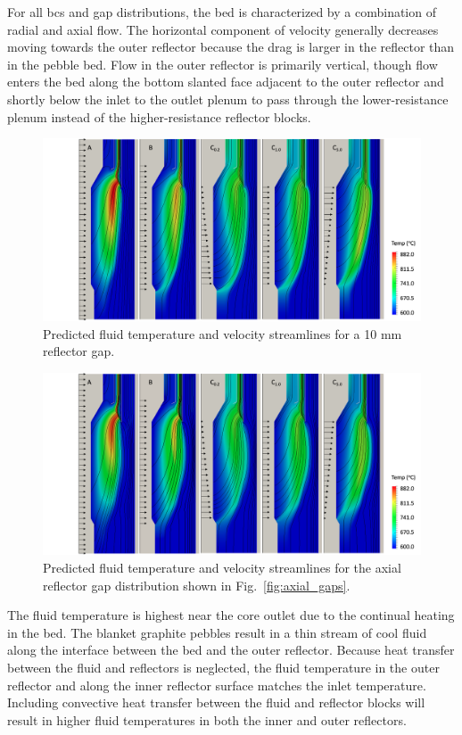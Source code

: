 For all \glspl{bc} and gap distributions, the bed is characterized by a combination of radial and axial flow. The horizontal component of velocity generally decreases moving towards the outer reflector because the drag is larger in the reflector than in the pebble bed. Flow in the outer reflector is primarily vertical, though flow enters the bed along the bottom slanted face adjacent to the outer reflector and shortly below the inlet to the outlet plenum to pass through the lower-resistance plenum instead of the higher-resistance reflector blocks.

\begin{figure}[!htb]
\centering
\includegraphics[width=0.85\linewidth]{figs/fluid_temp_1.png}
\caption{Predicted fluid temperature and velocity streamlines for a 10 \si{\milli\meter} reflector gap.}
\label{fig:bcs_temp2}
\end{figure}

\begin{figure}[!htb]
\centering
\includegraphics[width=0.85\linewidth]{figs/fluid_temp_axial.png}
\caption{Predicted fluid temperature and velocity streamlines for the axial reflector gap distribution shown in Fig.\ \ref{fig:axial_gaps}.}
\label{fig:bcs_temp3}
\end{figure}

The fluid temperature is highest near the core outlet due to the continual heating in the bed. The blanket graphite pebbles result in a thin stream of cool fluid along the interface between the bed and the outer reflector. Because heat transfer between the fluid and reflectors is neglected, the fluid temperature in the outer reflector and along the inner reflector surface matches the inlet temperature. Including convective heat transfer between the fluid and reflector blocks will result in higher fluid temperatures in both the inner and outer reflectors.

